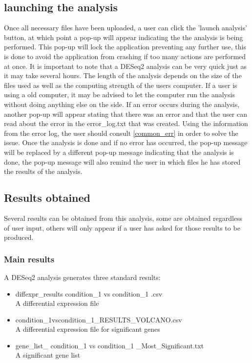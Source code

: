\documentclass[11pt]{article}
\begin{document}
\subsection{launching the analysis}
Once all necessary files have been uploaded, a user can click the 'launch analysis' button, at which point a pop-up will appear indicating the the analysis is being performed. This pop-up will lock the application preventing any further use, this is done to avoid the application from crashing if too many actions are performed at once.
It is important to note that a DESeq2 analysis can be very quick just as it may take several hours. The length of the analysis depends on the size of the files used as well as the computing strength of the users computer. If a user is using a old computer, it may be advised to let the computer run the analysis without doing anything else on the side. 
If an error occurs during the analysis, another pop-up will appear stating that there was an error and that the user can read about the error in the error\_log.txt that was created. Using the information from the error log, the user should consult \autoref{common_err} in order to solve the issue.
Once the analysis is done and if no error has occurred, the pop-up message will be replaced by a different pop-up message indicating that the analysis is done, the pop-up message will also remind the user in which files he has stored the results of the analysis.

\subsection{Results obtained}
Several results can be obtained from this analysis, some are obtained regardless of user input, others will only appear if a user has asked for those results to be produced.
\subsubsection{Main results}
A DESeq2 analysis generates three standard results:
\begin{itemize}
\item diffexpr\_results condition\_1 vs condition\_1 .csv\\
A differential expression file
\item condition\_1vscondition\_1\_RESULTS\_VOLCANO.csv\\
A differential expression file for significant genes
\item gene\_list\_ condition\_1 vs condition\_1 \_Most\_Significant.txt\\
A significant gene list
\end{itemize}
\end{document}
